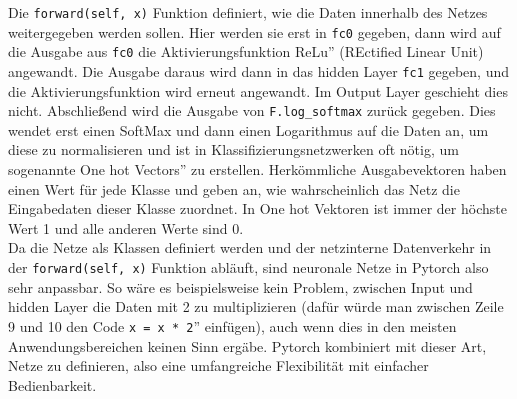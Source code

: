 \documentclass[11pt]{article}
\begin{document}
Die \texttt{forward(self, x)} Funktion definiert, wie die Daten innerhalb des Netzes weitergegeben werden sollen. Hier werden sie erst in \texttt{fc0} gegeben, dann wird auf die Ausgabe aus \texttt{fc0} die Aktivierungsfunktion \glqq ReLu'' (REctified Linear Unit) angewandt. Die Ausgabe daraus wird dann in das hidden Layer \texttt{fc1} gegeben, und die Aktivierungsfunktion wird erneut angewandt. Im Output Layer geschieht dies nicht. Abschließend wird die Ausgabe von \texttt{F.log_softmax} zurück gegeben. Dies wendet erst einen SoftMax und dann einen Logarithmus auf die Daten an, \cite{6} um diese zu normalisieren und ist in Klassifizierungsnetzwerken oft nötig, um sogenannte \glqq One hot Vectors'' zu erstellen. Herkömmliche Ausgabevektoren haben einen Wert für jede Klasse und geben an, wie wahrscheinlich das Netz die Eingabedaten dieser Klasse zuordnet. In One hot Vektoren ist immer der höchste Wert 1 und alle anderen Werte sind 0.\\
Da die Netze als Klassen definiert werden und der netzinterne Datenverkehr in der \texttt{forward(self, x)} Funktion abläuft, sind neuronale Netze in Pytorch also sehr anpassbar. So wäre es beispielsweise kein Problem, zwischen Input und hidden Layer die Daten mit 2 zu multiplizieren (dafür würde man zwischen Zeile 9 und 10 den Code \glqq\texttt{x = x * 2}'' einfügen), auch wenn dies in den meisten Anwendungsbereichen keinen Sinn ergäbe. Pytorch kombiniert mit dieser Art, Netze zu definieren, also eine umfangreiche Flexibilität mit einfacher Bedienbarkeit.
\end{document}
